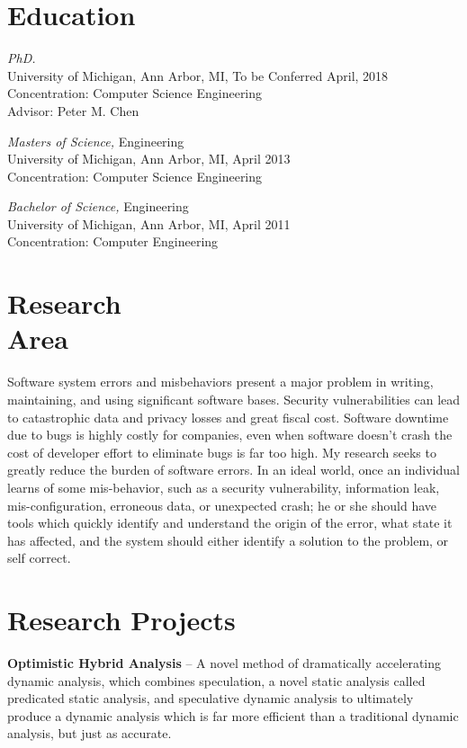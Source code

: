 \documentclass[margin, 10pt]{res} %
\begin{document}
\begin{resume}
 

\section{Education}

{\sl PhD.} \\
University of Michigan, Ann Arbor, MI, To be Conferred April, 2018 \\
Concentration: Computer Science Engineering \\
Advisor: Peter M. Chen

{\sl Masters of Science,} Engineering \\
University of Michigan, Ann Arbor, MI, April 2013 \\
Concentration: Computer Science Engineering

{\sl Bachelor of Science,} Engineering \\
University of Michigan, Ann Arbor, MI, April 2011 \\
Concentration: Computer Engineering


\section{Research \\Area}
Software system errors and misbehaviors present a major problem in
writing, maintaining, and using significant software bases.  Security
vulnerabilities can lead to catastrophic data and privacy losses and
great fiscal cost.  Software downtime due to bugs is highly costly for
companies, even when software doesn't crash the cost of developer
effort to eliminate bugs is far too high.  My research seeks to
greatly reduce the burden of software errors.  In an ideal world, once
an individual learns of some mis-behavior, such as a security
vulnerability, information leak, mis-configuration, erroneous data, or
unexpected crash; he or she should have tools which quickly identify
and understand the origin of the error, what state it has affected,
and the system should either identify a solution to the problem, or
self correct.

\section{Research Projects}
\textbf{Optimistic Hybrid Analysis} -- A novel method of dramatically
accelerating dynamic analysis, which combines speculation, a novel
static analysis called predicated static analysis, and speculative
dynamic analysis to ultimately produce a dynamic analysis which is far
more efficient than a traditional dynamic analysis, but just as
accurate.


\end{resume}
\end{document}
